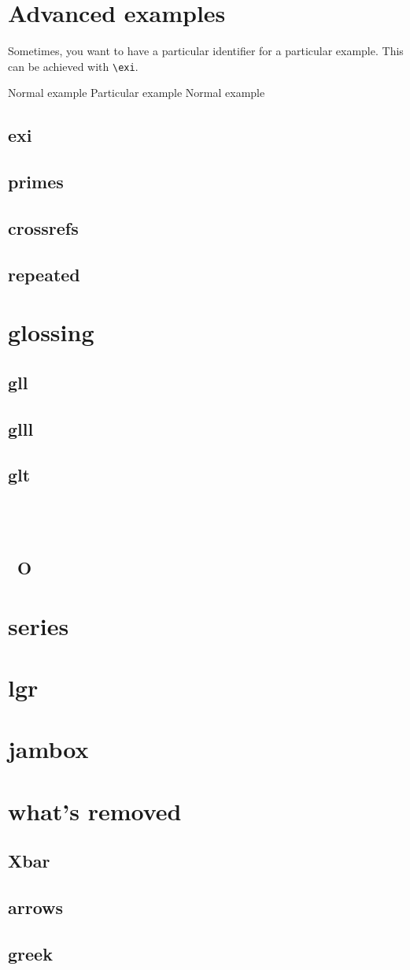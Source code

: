\documentclass[output=paper]{langscibook}
\newcommand{\cmd}[1]{\texttt{\textbackslash#1}}
\begin{document}
\section{Advanced examples}
Sometimes, you want to have a particular identifier for a particular example. This can be achieved with \cmd{exi}.

\ea Normal example
 Particular example
\ex Normal example
\z

\subsection{exi}
\subsection{primes}
\subsection{crossrefs}
\subsection{repeated}
\section{glossing}
\subsection{gll}
\subsection{glll}
\subsection{glt}
\subsection{~}
\subsection{\ O}
\section{series}
\section{lgr}
\section{jambox}
\section{what's removed}
\subsection{Xbar}
\subsection{arrows}
\subsection{greek}
\end{document}
